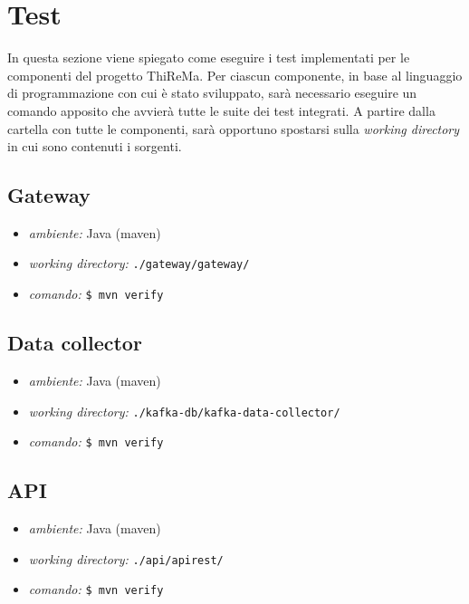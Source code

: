 \section{Test}
	In questa sezione viene spiegato come eseguire i test implementati per le componenti del progetto ThiReMa.
	Per ciascun componente, in base al linguaggio di programmazione con cui è stato sviluppato, sarà necessario eseguire un comando apposito che avvierà tutte le suite dei test integrati.
	A partire dalla cartella con tutte le componenti, sarà opportuno spostarsi sulla \textit{working directory} in cui sono contenuti i sorgenti. 

	\subsection{Gateway}
		
		\begin{itemize}
			\item \textit{ambiente:} Java (maven)
			\item \textit{working directory:} \verb!./gateway/gateway/!
			\item \textit{comando:} \verb!$ mvn verify!
		\end{itemize}
		

	\subsection{Data collector}

		\begin{itemize}
			\item \textit{ambiente:} Java (maven)
			\item \textit{working directory:} \verb!./kafka-db/kafka-data-collector/!
			\item \textit{comando:} \verb!$ mvn verify!
		\end{itemize}

	\subsection{API}

		\begin{itemize}
			\item \textit{ambiente:} Java (maven)
			\item \textit{working directory:} \verb!./api/apirest/!
			\item \textit{comando:} \verb!$ mvn verify!
		\end{itemize}


